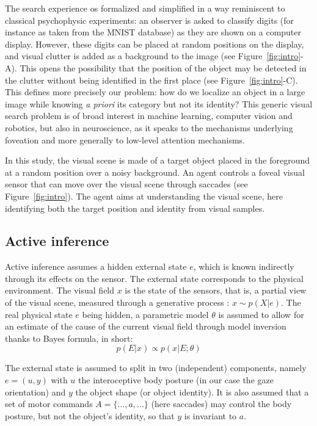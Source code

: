 The search experience os formalized and simplified in a way reminiscent to classical psychophysic experiments: an observer is asked to classify digits (for instance as taken from the MNIST database) as they are shown on a computer display. However, these digits can be placed at random positions on the display, and visual clutter is added as a background to the image (see Figure~\ref{fig:intro}-A). This opens the possibility that the position of the object may be detected in the clutter without being identified in the first place (see Figure~\ref{fig:intro}-C). This defines more precisely our problem: how do we localize an object in a large image while knowing \emph{a priori} its category but not its identity? This generic visual search problem is of broad interest in machine learning, computer vision and robotics, but also in neuroscience, as it speaks to the mechanisms underlying foveation and more generally to low-level attention mechanisms.

In this study, the visual scene is made of a target object placed in the foreground at a random position over a noisy background. An agent controls a foveal visual sensor that can move over the visual scene through saccades (see Figure~\ref{fig:intro}).
The agent aims at understanding the visual scene, here identifying both the target position and identity from visual samples.

\subsection{Active inference}
Active inference assumes a hidden external state $e$, which is known indirectly through its effects on the sensor. The external state corresponds to the physical environment. The visual field $x$ is the state of the sensors, that is, a partial view of the visual scene, measured through a generative process : $x\sim p(X|e)$. The real physical state $e$ being hidden, a parametric model $\theta$ is assumed to allow for an estimate of the cause of the current visual field through model inversion thanks to Bayes formula, in short:
$$p(E|x) \propto p(x|E;\theta)$$


The external state is assumed to split in two (independent) components, namely $e = (u,y)$ with $u$ the interoceptive body posture (in our case the gaze orientation) and $y$ the object shape (or object identity).
It is also assumed that a set of motor commands $A = \{..., a, ...\}$ (here saccades) may control the body posture, but not the object's identity, so that $y$ is invariant to $a$.

